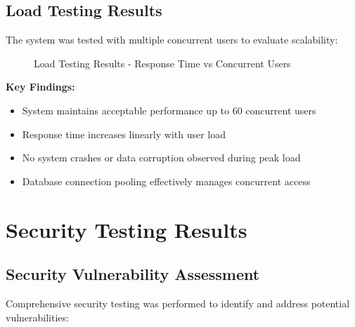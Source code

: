 \subsection{Load Testing Results}

The system was tested with multiple concurrent users to evaluate scalability:

\begin{figure}[h]
\centering
{}
\caption{Load Testing Results - Response Time vs Concurrent Users}
\label{fig:loadtest}
\end{figure}

\textbf{Key Findings:}
\begin{itemize}
    \item System maintains acceptable performance up to 60 concurrent users
    \item Response time increases linearly with user load
    \item No system crashes or data corruption observed during peak load
    \item Database connection pooling effectively manages concurrent access
\end{itemize}

\section{Security Testing Results}

\subsection{Security Vulnerability Assessment}

Comprehensive security testing was performed to identify and address potential vulnerabilities:

